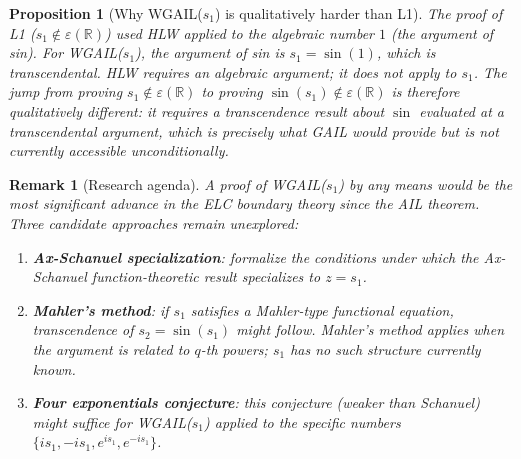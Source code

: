 \documentclass[11pt]{article}
\newtheorem{proposition}[theorem]{Proposition}
\newtheorem{remark}[theorem]{Remark}
\begin{document}
\begin{proposition}[Why WGAIL($s_1$) is qualitatively harder than L1]
The proof of L1 ($s_1 \notin \varepsilon(\mathbb{R})$) used HLW applied to the algebraic
number $1$ (the argument of sin). For WGAIL($s_1$), the argument of sin is $s_1 = \sin(1)$,
which is transcendental. HLW requires an algebraic argument; it does not apply to $s_1$.
The jump from proving $s_1 \notin \varepsilon(\mathbb{R})$ to proving
$\sin(s_1) \notin \varepsilon(\mathbb{R})$ is therefore qualitatively different:
it requires a transcendence result about $\sin$ evaluated at a transcendental argument,
which is precisely what GAIL would provide but is not currently accessible unconditionally.
\end{proposition}

\begin{remark}[Research agenda]
A proof of WGAIL($s_1$) by any means would be the most significant advance
in the ELC boundary theory since the AIL theorem.
Three candidate approaches remain unexplored:
\begin{enumerate}
  \item \textbf{Ax-Schanuel specialization}: formalize the conditions under which
    the Ax-Schanuel function-theoretic result specializes to $z = s_1$.
  \item \textbf{Mahler's method}: if $s_1$ satisfies a Mahler-type functional equation,
    transcendence of $s_2 = \sin(s_1)$ might follow.
    Mahler's method applies when the argument is related to $q$-th powers;
    $s_1$ has no such structure currently known.
  \item \textbf{Four exponentials conjecture}: this conjecture (weaker than Schanuel)
    might suffice for WGAIL($s_1$) applied to the specific numbers
    $\{is_1, -is_1, e^{is_1}, e^{-is_1}\}$.
\end{enumerate}
\end{remark}
\end{document}
